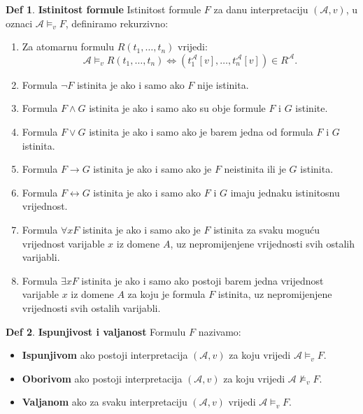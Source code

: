 \documentclass{article}
\theoremstyle{definition}
\newtheorem{definicija}{Def}[section]
\theoremstyle{plain}
\begin{document}
\begin{definicija}\textbf{Istinitost formule}\newline
    Istinitost formule \(F\) za danu interpretaciju \((\mathcal A,v)\), u oznaci \(\mathcal A\models_v F\), definiramo rekurzivno:\begin{enumerate}
        \item Za atomarnu formulu \(R(t_1,\ldots,t_n)\) vrijedi:
            \[
            \mathcal A\models_v R(t_1,\ldots,t_n)
            \iff
            (t_1^{\mathcal A}[v],\ldots,t_n^{\mathcal A}[v])
            \in R^{\mathcal A}.
            \]
        \item Formula \(\neg F\) istinita je ako i samo ako \(F\) nije istinita.
        \item Formula \(F\land G\) istinita je ako i samo ako su obje formule \(F\) i \(G\) istinite.
        \item Formula \(F\lor G\) istinita je ako i samo ako je barem jedna od formula \(F\) i \(G\) istinita.
        \item Formula \(F\rightarrow G\) istinita je ako i samo ako je \(F\) neistinita ili je \(G\) istinita.
        \item Formula \(F\leftrightarrow G\) istinita je ako i samo ako \(F\) i \(G\) imaju jednaku istinitosnu vrijednost.
        \item Formula \(\forall xF\) istinita je ako i samo ako je \(F\) istinita za svaku moguću vrijednost varijable \(x\) iz domene \(A\), uz nepromijenjene vrijednosti svih ostalih varijabli.
        \item Formula \(\exists xF\) istinita je ako i samo ako postoji barem jedna vrijednost varijable \(x\) iz domene \(A\) za koju je formula \(F\) istinita, uz nepromijenjene vrijednosti svih ostalih varijabli.
    \end{enumerate}
\end{definicija}

\begin{definicija}\textbf{Ispunjivost i valjanost}\newline
    Formulu \(F\) nazivamo:\begin{itemize}
        \item \textbf{Ispunjivom} ako postoji interpretacija \((\mathcal A,v)\) za koju vrijedi \(\mathcal A\models_v F\).
        \item \textbf{Oborivom} ako postoji interpretacija \((\mathcal A,v)\) za koju vrijedi \(\mathcal A\not\models_v F\).
        \item \textbf{Valjanom} ako za svaku interpretaciju \((\mathcal A,v)\) vrijedi \(\mathcal A\models_v F\).
    \end{itemize}
\end{definicija}
\end{document}
